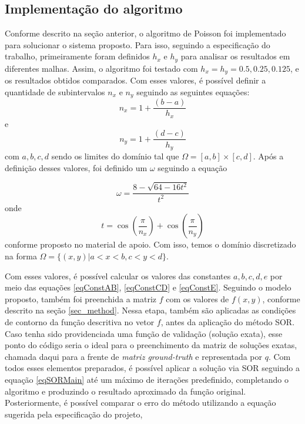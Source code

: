 \documentclass[oneside]{abntex2}
\begin{document}
\subsection{Implementação do algoritmo}
Conforme descrito na seção anterior, o algoritmo de Poisson foi implementado para solucionar o sistema proposto. Para isso, seguindo a especificação do trabalho, primeiramente foram definidos $h_x$ e $h_y$ para analisar os resultados em diferentes malhas. Assim, o algoritmo foi testado com $h_x = h_y = 0.5, 0.25, 0.125$, e os resultados obtidos comparados. Com esses valores, é possível definir a quantidade de subintervalos $n_x$ e $n_y$ seguindo as seguintes equações:
\begin{equation}
    n_x = 1 + \frac{(b-a)}{h_x}    
\end{equation}
e
\begin{equation}
    n_y = 1 + \frac{(d-c)}{h_y}
\end{equation}
com $a, b, c, d$ sendo os limites do domínio tal que $\Omega = [a, b] \times [c, d] $. Após a definição desses valores, foi definido um $\omega$ seguindo a equação 

\begin{equation}
\label{eqOmega}
    \omega = \frac{8-\sqrt{64-16t^2}}{t^2}
\end{equation}
onde
\begin{equation}
\label{eqOmegaT}
    t = \cos{\left(\frac{\pi}{n_x}\right)} + \cos{\left(\frac{\pi}{n_y}\right)}
\end{equation}
conforme proposto no material de apoio. Com isso, temos o domínio discretizado na forma $\Omega = \{(x, y) | a<x<b, c<y<d\}$.

Com esses valores, é possível calcular os valores das constantes $a, b, c, d, e$ por meio das equações \ref{eqConstAB}, \ref{eqConstCD} e \ref{eqConstE}. Seguindo o modelo proposto, também foi preenchida a matriz $f$ com os valores de $f(x,y)$, conforme descrito na seção \ref{sec_method}. Nessa etapa, também são aplicadas as condições de contorno da função descritiva no vetor $f$, antes da aplicação do método SOR. Caso tenha sido providenciada uma função de validação (solução exata), esse ponto do código seria o ideal para o preenchimento da matriz de soluções exatas, chamada daqui para a frente de \textit{matriz ground-truth} e representada por $q$. Com todos esses elementos preparados, é possível aplicar a solução via SOR seguindo a equação \ref{eqSORMain} até um máximo de iterações predefinido, completando o algoritmo e produzindo o resultado aproximado da função original. Posteriormente, é possível comparar o erro do método utilizando a equação sugerida pela especificação do projeto, 
\end{document}
